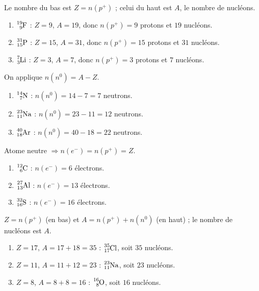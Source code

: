 \documentclass[11pt,a4paper]{article}
\begin{document}
\begin{corrige}
Le nombre du bas est $Z=n(p^+)$ ; celui du haut est $A$, le nombre de nucléons.
\begin{enumerate}[label=\alph*)]
  \item $\ce{^{19}_{9}F}$ : $Z=9$, $A=19$, donc $n(p^+)=9$ protons et $19$ nucléons.
  \item $\ce{^{31}_{15}P}$ : $Z=15$, $A=31$, donc $n(p^+)=15$ protons et $31$ nucléons.
  \item $\ce{^{7}_{3}Li}$ : $Z=3$, $A=7$, donc $n(p^+)=3$ protons et $7$ nucléons.
\end{enumerate}
\end{corrige}

\begin{corrige}
On applique $n(n^0) = A - Z$.
\begin{enumerate}[label=\alph*)]
  \item $\ce{^{14}_{7}N}$ : $n(n^0) = 14 - 7 = 7$ neutrons.
  \item $\ce{^{23}_{11}Na}$ : $n(n^0) = 23 - 11 = 12$ neutrons.
  \item $\ce{^{40}_{18}Ar}$ : $n(n^0) = 40 - 18 = 22$ neutrons.
\end{enumerate}
\end{corrige}

\begin{corrige}
Atome neutre $\Rightarrow n(e^-) = n(p^+) = Z$.
\begin{enumerate}[label=\alph*)]
  \item $\ce{^{12}_{6}C}$ : $n(e^-) = 6$ électrons.
  \item $\ce{^{27}_{13}Al}$ : $n(e^-) = 13$ électrons.
  \item $\ce{^{32}_{16}S}$ : $n(e^-) = 16$ électrons.
\end{enumerate}
\end{corrige}

\begin{corrige}
$Z = n(p^+)$ (en bas) et $A = n(p^+) + n(n^0)$ (en haut) ; le nombre de nucléons est $A$.
\begin{enumerate}[label=\alph*)]
  \item $Z=17$, $A = 17+18 = 35$ : $\ce{^{35}_{17}Cl}$, soit $35$ nucléons.
  \item $Z=11$, $A = 11+12 = 23$ : $\ce{^{23}_{11}Na}$, soit $23$ nucléons.
  \item $Z=8$, $A = 8+8 = 16$ : $\ce{^{16}_{8}O}$, soit $16$ nucléons.
\end{enumerate}
\end{corrige}
\end{document}
